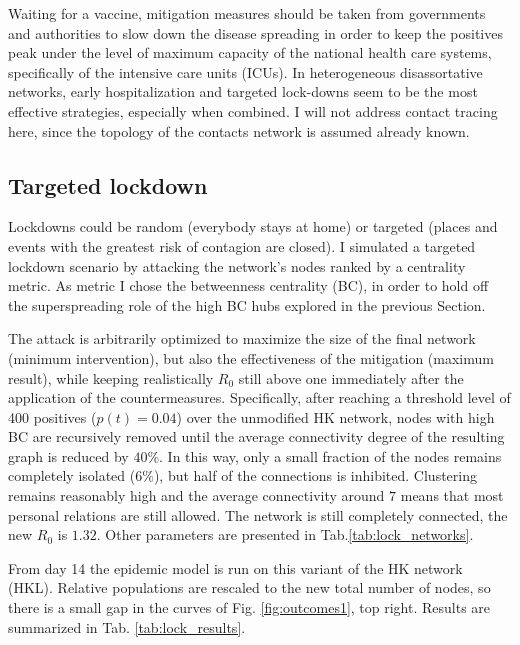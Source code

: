 \documentclass[DIV=12, BCOR=0pt]{scrartcl}  %
\begin{document}
	Waiting for a vaccine, mitigation measures should be taken from governments and authorities to slow down the disease spreading in order to keep the positives peak under the level of maximum capacity of the national health care systems, specifically of the intensive care units (ICUs). 
	In heterogeneous disassortative networks, early hospitalization and targeted lock-downs seem to be the most effective strategies, especially when combined. I will not address contact tracing here, since the topology of the contacts network is assumed already known. 
	
	\subsection{Targeted lockdown}
	Lockdowns could be random (everybody stays at home) or targeted (places and events with the greatest risk of contagion are closed). I simulated a targeted lockdown scenario by attacking the network's nodes ranked by a centrality metric. As metric I chose the betweenness centrality (BC), in order to hold off the superspreading role of the high BC hubs explored in the previous Section.
	
	The attack is arbitrarily optimized to maximize the size of the final network (minimum intervention), but also the effectiveness of the mitigation (maximum result), while keeping realistically $R_0$ still above one immediately after the application of the countermeasures.
	Specifically, after reaching a threshold level of 400 positives ($p(t) = 0.04$) over the unmodified HK network, nodes with high BC are recursively removed until the average connectivity degree of the resulting graph is reduced by $ 40 \%$. 
	In this way, only a small fraction of the nodes remains completely isolated ($6 \%$), but half of the connections is inhibited. Clustering remains reasonably high and the average connectivity around $7$ means that most personal relations are still allowed. The network is still completely connected, the new $R_0$ is $1.32$. Other parameters are presented in Tab.\ref{tab:lock_networks}. 
	
	From day 14 the epidemic model is run on this variant of the HK network (HKL). Relative populations are rescaled to the new total number of nodes, so there is a small gap in the curves of Fig. \ref{fig:outcomes1}, top right.
	Results are summarized in Tab. \ref{tab:lock_results}.
	
\end{document}
